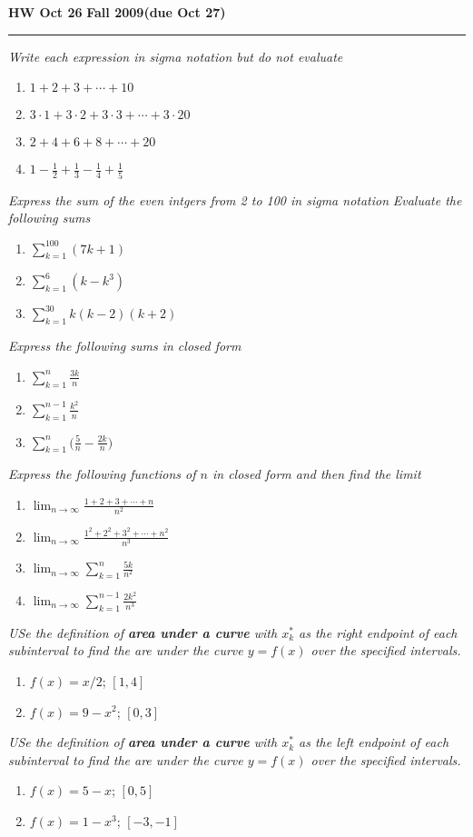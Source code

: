 \documentclass[12pt]{amsart}
\begin{document}
\hfill{\large\bf HW Oct 26}\hfill{\large\bf
  Fall 2009}\hfill{\large\bf (due Oct 27)}\hrule

\bigskip
{\problem \em Write each expression in sigma notation but do not evaluate}
\begin{enumerate}
\item $1+2+3+\dotsb+10$
\item $3\cdot1 + 3 \cdot 2 + 3\cdot 3 + \dotsb +3 \cdot 20$
\item $2+4+6+8+ \dotsb + 20$
\item $1- \tfrac{1}{2} + \tfrac{1}{3} - \tfrac{1}{4} +\tfrac{1}{5}$
\end{enumerate}
{\problem \em Express the sum of the even intgers from 2 to 100 in sigma notation}
{\problem \em Evaluate the following sums}
\begin{enumerate}
\item $\displaystyle{\sum_{k=1}^{100} (7k+1)}$
\item $\displaystyle{\sum_{k=1}^{6} (k-k^3)}$
\item $\displaystyle{\sum_{k=1}^{30} k(k-2)(k+2)}$
\end{enumerate}
{\problem \em Express the following sums in closed form}
\begin{enumerate}
\item $\displaystyle{\sum_{k=1}^{n} \frac{3k}{n}}$
\item $\displaystyle{\sum_{k=1}^{n-1} \frac{k^2}{n}}$
\item $\displaystyle{\sum_{k=1}^{n} \bigg( \frac{5}{n} - \frac{2k}{n} \bigg)}$
\end{enumerate}
{\problem \em Express the following functions of $n$ in closed form and then find the limit}
\begin{enumerate}
\item $\displaystyle{\lim_{n \to \infty} \frac{1+2+3+ \dotsb+n}{n^2}}$
\item $\displaystyle{\lim_{n \to \infty} \frac{1^2+2^2+3^2+ \dotsb+n^2}{n^3}}$
\item $\displaystyle{\lim_{n \to \infty} \sum_{k=1}^n \frac{5k}{n^2}}$
\item $\displaystyle{\lim_{n \to \infty} \sum_{k=1}^{n-1} \frac{2k^2}{n^3}}$
\end{enumerate}
{\problem \em USe the definition of \textbf{area under a curve} with $x_k^\ast$ as the {\em right} endpoint of each subinterval to find the are under the curve $y=f(x)$ over the specified intervals.}
\begin{enumerate}
\item $f(x) = x/2$; $[1,4]$
\item $f(x) = 9-x^2$; $[0,3]$
\end{enumerate}
{\problem \em USe the definition of \textbf{area under a curve} with $x_k^\ast$ as the {\em left} endpoint of each subinterval to find the are under the curve $y=f(x)$ over the specified intervals.}
\begin{enumerate}
\item $f(x) = 5-x$; $[0,5]$
\item $f(x) = 1-x^3$; $[-3,-1]$
\end{enumerate}
\end{document}
